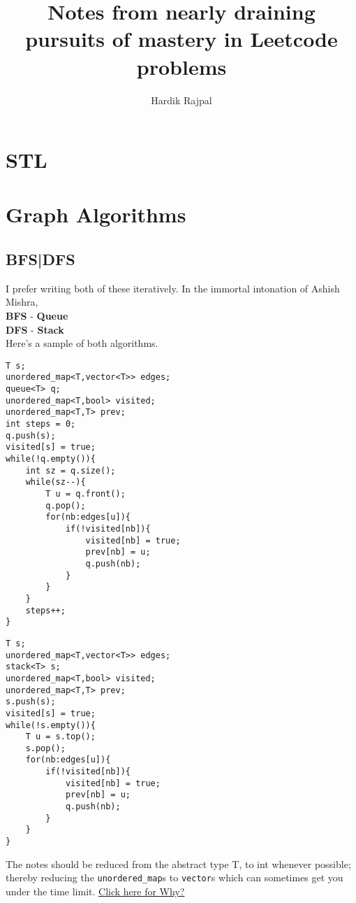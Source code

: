 \documentclass{article}
\author{Hardik Rajpal}
\title{Notes from nearly draining pursuits of mastery in Leetcode problems}
\begin{document}
\maketitle
\tableofcontents
\pagebreak
\section{STL}
\section{Graph Algorithms}
\subsection{BFS|DFS}
I prefer writing both of these iteratively. In the immortal
intonation of Ashish Mishra,\\
\textbf{BFS} - \textbf{Queue}\\
\textbf{DFS} - \textbf{Stack}\\
Here's a sample of both algorithms.\\
\noindent\begin{minipage}{.45\textwidth}
    \begin{lstlisting}[caption=BFS]
T s;
unordered_map<T,vector<T>> edges;
queue<T> q;
unordered_map<T,bool> visited;
unordered_map<T,T> prev;
int steps = 0;
q.push(s);
visited[s] = true;
while(!q.empty()){
    int sz = q.size();
    while(sz--){
        T u = q.front();
        q.pop();
        for(nb:edges[u]){
            if(!visited[nb]){
                visited[nb] = true;
                prev[nb] = u;
                q.push(nb);
            }
        }
    }
    steps++;
}
        \end{lstlisting}
    \end{minipage}\hfill
    \begin{minipage}{.45\textwidth}
        \begin{lstlisting}[caption=DFS]
T s;
unordered_map<T,vector<T>> edges;
stack<T> s;
unordered_map<T,bool> visited;
unordered_map<T,T> prev;
s.push(s);
visited[s] = true;
while(!s.empty()){
    T u = s.top();
    s.pop();
    for(nb:edges[u]){
        if(!visited[nb]){
            visited[nb] = true;
            prev[nb] = u;
            q.push(nb);
        }
    }
}
\end{lstlisting}
\end{minipage}
The notes should be reduced from the abstract type T, to
int whenever possible; thereby reducing the
\texttt{unordered\_map}s to \texttt{vector}s which can
sometimes get you under the time limit.
\href{https://stackoverflow.com/questions/55451825/why-is-vector-faster-than-unordered-map}{Click here for Why?}
\end{document}
